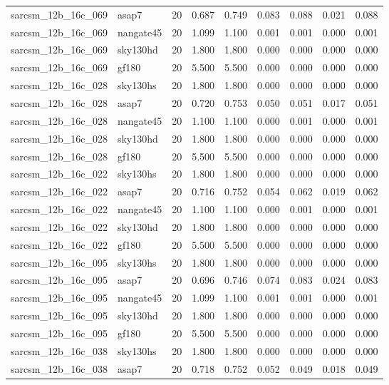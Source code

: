 \begin{tabular}{llrrrrrrr}
sarcsm\_12b\_16c\_069 & asap7 & 20 & 0.687 & 0.749 & 0.083 & 0.088 & 0.021 & 0.088 \\
sarcsm\_12b\_16c\_069 & nangate45 & 20 & 1.099 & 1.100 & 0.001 & 0.001 & 0.000 & 0.001 \\
sarcsm\_12b\_16c\_069 & sky130hd & 20 & 1.800 & 1.800 & 0.000 & 0.000 & 0.000 & 0.000 \\
sarcsm\_12b\_16c\_069 & gf180 & 20 & 5.500 & 5.500 & 0.000 & 0.000 & 0.000 & 0.000 \\
sarcsm\_12b\_16c\_028 & sky130hs & 20 & 1.800 & 1.800 & 0.000 & 0.000 & 0.000 & 0.000 \\
sarcsm\_12b\_16c\_028 & asap7 & 20 & 0.720 & 0.753 & 0.050 & 0.051 & 0.017 & 0.051 \\
sarcsm\_12b\_16c\_028 & nangate45 & 20 & 1.100 & 1.100 & 0.000 & 0.001 & 0.000 & 0.001 \\
sarcsm\_12b\_16c\_028 & sky130hd & 20 & 1.800 & 1.800 & 0.000 & 0.000 & 0.000 & 0.000 \\
sarcsm\_12b\_16c\_028 & gf180 & 20 & 5.500 & 5.500 & 0.000 & 0.000 & 0.000 & 0.000 \\
sarcsm\_12b\_16c\_022 & sky130hs & 20 & 1.800 & 1.800 & 0.000 & 0.000 & 0.000 & 0.000 \\
sarcsm\_12b\_16c\_022 & asap7 & 20 & 0.716 & 0.752 & 0.054 & 0.062 & 0.019 & 0.062 \\
sarcsm\_12b\_16c\_022 & nangate45 & 20 & 1.100 & 1.100 & 0.000 & 0.001 & 0.000 & 0.001 \\
sarcsm\_12b\_16c\_022 & sky130hd & 20 & 1.800 & 1.800 & 0.000 & 0.000 & 0.000 & 0.000 \\
sarcsm\_12b\_16c\_022 & gf180 & 20 & 5.500 & 5.500 & 0.000 & 0.000 & 0.000 & 0.000 \\
sarcsm\_12b\_16c\_095 & sky130hs & 20 & 1.800 & 1.800 & 0.000 & 0.000 & 0.000 & 0.000 \\
sarcsm\_12b\_16c\_095 & asap7 & 20 & 0.696 & 0.746 & 0.074 & 0.083 & 0.024 & 0.083 \\
sarcsm\_12b\_16c\_095 & nangate45 & 20 & 1.099 & 1.100 & 0.001 & 0.001 & 0.000 & 0.001 \\
sarcsm\_12b\_16c\_095 & sky130hd & 20 & 1.800 & 1.800 & 0.000 & 0.000 & 0.000 & 0.000 \\
sarcsm\_12b\_16c\_095 & gf180 & 20 & 5.500 & 5.500 & 0.000 & 0.000 & 0.000 & 0.000 \\
sarcsm\_12b\_16c\_038 & sky130hs & 20 & 1.800 & 1.800 & 0.000 & 0.000 & 0.000 & 0.000 \\
sarcsm\_12b\_16c\_038 & asap7 & 20 & 0.718 & 0.752 & 0.052 & 0.049 & 0.018 & 0.049 \\

\end{tabular}
